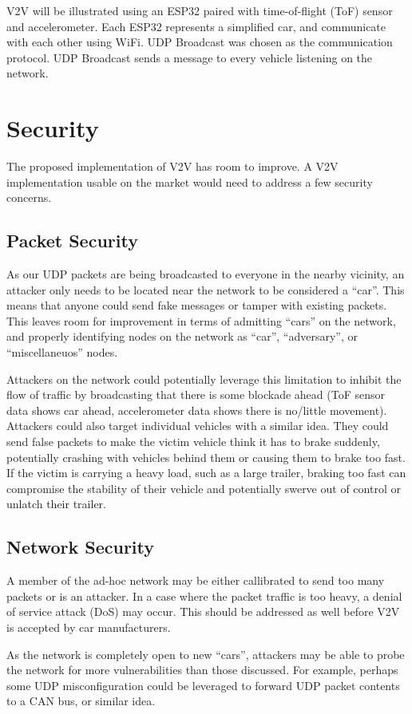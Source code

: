 \documentclass[conference]{IEEEtran}
\begin{document}
V2V will be illustrated using an ESP32 paired with time-of-flight (ToF) sensor
and accelerometer. Each ESP32 represents a simplified car, and communicate with
each other using WiFi. UDP Broadcast was chosen as the communication protocol. 
UDP Broadcast sends a message to every vehicle listening on the network.

\section{Security}
The proposed implementation of V2V has room to improve. A V2V implementation usable on
the market would need to address a few security concerns.

\subsection{Packet Security}
As our UDP packets are being broadcasted to everyone in the nearby vicinity, an
attacker only needs to be located near the network to be considered a ``car''.
This means that anyone could send fake messages or tamper with existing packets.
This leaves room for improvement in terms of admitting ``cars'' on the network,
and properly identifying nodes on the network as ``car'', ``adversary'', or
``miscellaneuos'' nodes.

Attackers on the network could potentially leverage this limitation to inhibit
the flow of traffic by broadcasting that there is some blockade ahead (ToF
sensor data shows car ahead, accelerometer data shows there is no/little
movement). Attackers could also target individual vehicles with a similar idea.
They could send false packets to make the victim vehicle think it has to brake
suddenly, potentially crashing with vehicles behind them or causing them to
brake too fast. If the victim is carrying a heavy load, such as a large trailer,
braking too fast can compromise the stability of their vehicle and potentially
swerve out of control or unlatch their trailer.

\subsection{Network Security}
A member of the ad-hoc network may be either callibrated to send too many
packets or is an attacker. In a case where the packet traffic is too heavy, a
denial of service attack (DoS) may occur. This should be addressed as well
before V2V is accepted by car manufacturers.

As the network is completely open to new ``cars'', attackers may be able to
probe the network for more vulnerabilities than those discussed. For example,
perhaps some UDP misconfiguration could be leveraged to forward UDP packet
contents to a CAN bus, or similar idea.
\end{document}
